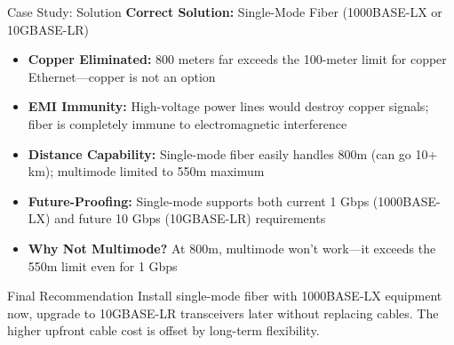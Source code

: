 \documentclass[aspectratio=169]{beamer}
\begin{document}
\begin{frame}{Case Study: Solution}
    \textbf{Correct Solution:} Single-Mode Fiber (1000BASE-LX or 10GBASE-LR)
    
    \vspace{0.3cm}
    \begin{itemize}
        \small
        \item \textbf{Copper Eliminated:} 800 meters far exceeds the 100-meter limit for copper Ethernet---copper is not an option
        \item \textbf{EMI Immunity:} High-voltage power lines would destroy copper signals; fiber is completely immune to electromagnetic interference
        \item \textbf{Distance Capability:} Single-mode fiber easily handles 800m (can go 10+ km); multimode limited to 550m maximum
        \item \textbf{Future-Proofing:} Single-mode supports both current 1 Gbps (1000BASE-LX) and future 10 Gbps (10GBASE-LR) requirements
        \item \textbf{Why Not Multimode?} At 800m, multimode won't work---it exceeds the 550m limit even for 1 Gbps
    \end{itemize}
    
    \vspace{0.3cm}
    \begin{alertblock}{Final Recommendation}
        Install single-mode fiber with 1000BASE-LX equipment now, upgrade to 10GBASE-LR transceivers later without replacing cables. The higher upfront cable cost is offset by long-term flexibility.
    \end{alertblock}
\end{frame}
\end{document}
